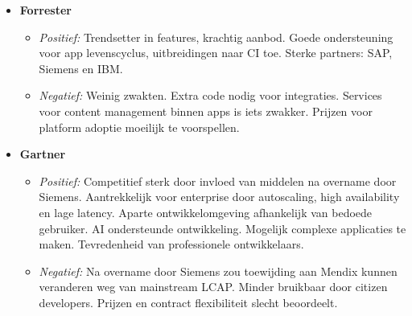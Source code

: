 \begin{itemize}
    \item \textbf{Forrester}
    \begin{itemize}
        \item \textit{Positief:} Trendsetter in features, krachtig aanbod. Goede ondersteuning voor app levenscyclus, uitbreidingen naar CI toe. Sterke partners: SAP, Siemens en IBM.
        \item \textit{Negatief:} Weinig zwakten. Extra code nodig voor integraties. Services voor content management binnen apps is iets zwakker. Prijzen voor platform adoptie moeilijk te voorspellen.
    \end{itemize}
    \item \textbf{Gartner}
    \begin{itemize}
        \item \textit{Positief:} Competitief sterk door invloed van middelen na overname door Siemens. Aantrekkelijk voor enterprise door autoscaling, high availability en lage latency. Aparte ontwikkelomgeving afhankelijk van bedoede gebruiker. AI ondersteunde ontwikkeling. Mogelijk complexe applicaties te maken. Tevredenheid van professionele ontwikkelaars.
        \item \textit{Negatief:} Na overname door Siemens zou toewijding aan Mendix kunnen veranderen weg van mainstream LCAP. Minder bruikbaar door citizen developers. Prijzen en contract flexibiliteit slecht beoordeelt.
    \end{itemize}
\end{itemize}

 

